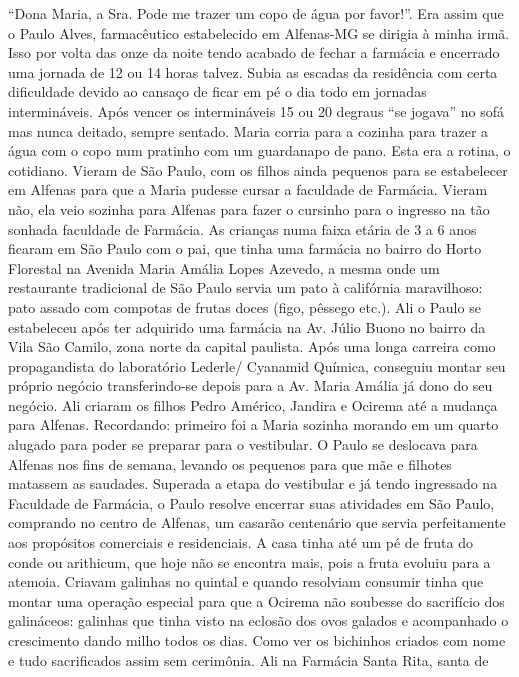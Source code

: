 \documentclass[12pt,brazil,]{book}
\begin{document}
``Dona Maria, a Sra. Pode me trazer um copo de água por favor!''. Era
assim que o Paulo Alves, farmacêutico estabelecido em Alfenas-MG se
dirigia à minha irmã. Isso por volta das onze da noite tendo acabado de
fechar a farmácia e encerrado uma jornada de 12 ou 14 horas talvez.
Subia as escadas da residência com certa dificuldade devido ao cansaço
de ficar em pé o dia todo em jornadas intermináveis. Após vencer os
intermináveis 15 ou 20 degraus ``se jogava'' no sofá mas nunca deitado,
sempre sentado. Maria corria para a cozinha para trazer a água com o
copo num pratinho com um guardanapo de pano. Esta era a rotina, o
cotidiano. Vieram de São Paulo, com os filhos ainda pequenos para se
estabelecer em Alfenas para que a Maria pudesse cursar a faculdade de
Farmácia. Vieram não, ela veio sozinha para Alfenas para fazer o
cursinho para o ingresso na tão sonhada faculdade de Farmácia. As
crianças numa faixa etária de 3 a 6 anos ficaram em São Paulo com o pai,
que tinha uma farmácia no bairro do Horto Florestal na Avenida Maria
Amália Lopes Azevedo, a mesma onde um restaurante tradicional de São
Paulo servia um pato à califórnia maravilhoso: pato assado com compotas
de frutas doces (figo, pêssego etc.). Ali o Paulo se estabeleceu após
ter adquirido uma farmácia na Av. Júlio Buono no bairro da Vila São
Camilo, zona norte da capital paulista. Após uma longa carreira como
propagandista do laboratório Lederle/ Cyanamid Química, conseguiu montar
seu próprio negócio transferindo-se depois para a Av. Maria Amália já
dono do seu negócio. Ali criaram os filhos Pedro Américo, Jandira e
Ocirema até a mudança para Alfenas. Recordando: primeiro foi a Maria
sozinha morando em um quarto alugado para poder se preparar para o
vestibular. O Paulo se deslocava para Alfenas nos fins de semana,
levando os pequenos para que mãe e filhotes matassem as saudades.
Superada a etapa do vestibular e já tendo ingressado na Faculdade de
Farmácia, o Paulo resolve encerrar suas atividades em São Paulo,
comprando no centro de Alfenas, um casarão centenário que servia
perfeitamente aos propósitos comerciais e residenciais. A casa tinha até
um pé de fruta do conde ou arithicum, que hoje não se encontra mais,
pois a fruta evoluiu para a atemoia. Criavam galinhas no quintal e
quando resolviam consumir tinha que montar uma operação especial para
que a Ocirema não soubesse do sacrifício dos galináceos: galinhas que
tinha visto na eclosão dos ovos galados e acompanhado o crescimento
dando milho todos os dias. Como ver os bichinhos criados com nome e tudo
sacrificados assim sem cerimônia. Ali na Farmácia Santa Rita, santa de
\end{document}
